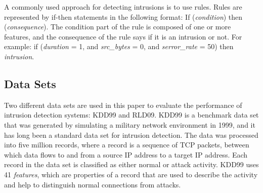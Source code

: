\documentclass{sig-alternate}
\begin{document}
A commonly used approach for detecting intrusions is to use rules. Rules are represented by if-then statements in the following format: If (\emph{condition}) then (\emph{consequence}). The condition part of the rule is composed of one or more features, and the consequence of the rule says if it is an intrusion or not. For example: if (\emph{duration} = 1, and \emph{src\_bytes} = 0, and \emph{serror\_rate} = 50) then \emph{intrusion}.~\cite{Fries:2008:FAN:1388969.1389037}




\subsection{Data Sets}
\label{sec:dataSets}
Two different data sets are used in this paper to evaluate the performance of intrusion detection systems: KDD99 and RLD09. KDD99 is a benchmark data set that was generated by simulating a military network environment in 1999, and it has long been a standard data set for intrusion detection. The data was processed into five million records, where a record is a sequence of TCP packets, between which data flows to and from a source IP address to a target IP address. Each record in the data set is classified as either normal or attack activity. KDD99 uses 41 \emph{features}, which are properties of a record that are used to describe the activity and help to distinguish normal connections from attacks.~\cite{KDD99}
\end{document}
